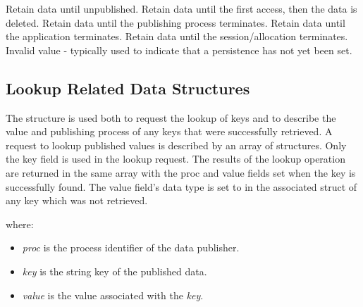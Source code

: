 \begin{constantdesc}
%
Retain data until unpublished.
%
Retain data until the first access, then the data is deleted.
%
Retain data until the publishing process terminates.
%
Retain data until the application terminates.
%
Retain data until the session/allocation terminates.
%
Invalid value - typically used to indicate that a persistence has not yet been set.
%
\end{constantdesc}


\subsection{Lookup Related Data Structures}


The  structure is used both to request the lookup of keys and to describe the value and publishing process of any keys that were successfully retrieved.
A request to lookup published values is described by an array of  structures.
Only the key field is used in the lookup request.
The results of the lookup operation are returned in the same array with the proc and value fields set when the key is successfully found.
The value field's data type is set to  in the associated  struct of any key which was not retrieved.
%

where:
\begin{itemize}
    \item \emph{proc} is the process identifier of the data publisher.
    \item \emph{key} is the string key of the published data.
    \item \emph{value} is the value associated with the \emph{key}.
\end{itemize}


